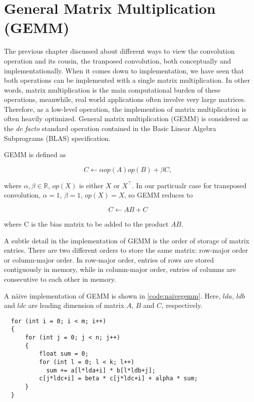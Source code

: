 
\chapter{General Matrix Multiplication (GEMM)}

The previous chapter discussed about different ways to view the convolution operation and its cousin,
the tranposed convolution, both conceptually and implementationally. When it comes down to implementation,
we have seen that both operations can be implemented with a single matrix multiplication. In other words,
matrix multiplication is the main computational burden of these operations, meanwhile, real world applications
often involve very large matrices. Therefore, as a low-level operation, the implemention of matrix
multiplication is often heavily optimized. General matrix multiplication (GEMM) is considered as the
\textit{de facto} standard operation contained in the Basic Linear Algebra Subprograms (BLAS)
specification.

GEMM is defined as

$$C \leftarrow \alpha op(A) op(B) + \beta C,$$

where $\alpha, \beta \in \mathbb{R}$, $op(X)$ is either $X$ or $X^\intercal$. In our particualr case for transposed convolution, $\alpha = 1$, $\beta = 1$, $op(X) = X$, so GEMM reduces to

$$C \leftarrow A B + C$$

where C is the bias matrix to be added to the product $A B$.

A subtle detail in the implementation of GEMM is the order of storage of matrix entries. There are two
different orders to store the same matrix: row-major order or column-major order. In row-major order,
entries of rows are stored contiguously in memory, while in column-major order, entries of columns are
consecutive to each other in memory.

A näive implementation of GEMM is shown in \ref{code:naivegemm}. Here, $lda$, $ldb$ and $ldc$ are leading
dimension of matrix $A$, $B$ and $C$, respectively.

\begin{code}
  \begin{verbatim}
  for (int i = 0; i < m; i++)
  {
      for (int j = 0; j < n; j++)
      {
          float sum = 0;
          for (int l = 0; l < k; l++)
            sum += a[l*lda+i] * b[l*ldb+j];
          c[j*ldc+i] = beta * c[j*ldc+i] + alpha * sum;
      }
  }
  \end{verbatim}
  \label{code:naivegemm}
\end{code}

\clearpage %

